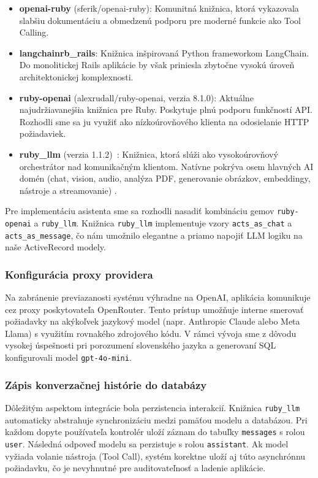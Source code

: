 \begin{itemize}
	\item \textbf{openai-ruby} (sferik/openai-ruby): Komunitná knižnica, ktorá
		vykazovala slabšiu dokumentáciu a obmedzenú podporu pre moderné funkcie ako
		Tool Calling.

	\item \textbf{langchainrb\_rails}: Knižnica inšpirovaná Python frameworkom LangChain.
		Do monolitickej Rails aplikácie by však priniesla zbytočne vysokú úroveň
		architektonickej komplexnosti.

	\item \textbf{ruby-openai} (alexrudall/ruby-openai, verzia 8.1.0): Aktuálne najudržiavanejšia
		knižnica pre Ruby. Poskytuje plnú podporu funkčností API. Rozhodli sme sa ju využiť
		ako nízkoúrovňového klienta na odosielanie HTTP požiadaviek.

	\item \textbf{ruby\_llm} (verzia 1.1.2)~\cite{rubyllm2025}: Knižnica, ktorá slúži
		ako vysokoúrovňový %
		orchestrátor nad komunikačným klientom. Natívne pokrýva osem hlavných AI domén
		(chat, vision, audio, analýza PDF, generovanie obrázkov, embeddingy,
		nástroje a streamovanie) \cite{atkinson2025}.
\end{itemize}

Pre implementáciu asistenta sme sa rozhodli nasadiť kombináciu gemov \texttt{ruby-openai}
a \texttt{ruby\_llm}. Knižnica \texttt{ruby\_llm} implementuje vzory \texttt{acts\_as\_chat}
a \texttt{acts\_as\_message}, čo nám umožnilo elegantne a priamo napojiť LLM logiku
na naše ActiveRecord modely.

\subsubsection{Konfigurácia proxy providera}
Na zabránenie previazanosti systému výhradne na OpenAI, aplikácia komunikuje cez
proxy poskytovateľa OpenRouter. Tento prístup umožňuje interne smerovať požiadavky
na akýkoľvek jazykový model (napr. Anthropic Claude alebo Meta Llama) s využitím
rovnakého zdrojového kódu. V rámci vývoja sme z dôvodu vysokej úspešnosti pri porozumení
slovenského jazyka a generovaní SQL konfigurovali model \texttt{gpt-4o-mini}.

\subsubsection{Zápis konverzačnej histórie do databázy}
Dôležitým aspektom integrácie bola perzistencia interakcií. Knižnica \texttt{ruby\_llm}
automaticky abstrahuje synchronizáciu medzi pamäťou modelu a databázou. Pri každom
dopyte používateľa kontrolér uloží záznam do tabuľky \texttt{messages} s rolou
\texttt{user}. Následná odpoveď modelu sa perzistuje s rolou \texttt{assistant}.
Ak model vyžiada volanie nástroja (Tool Call), systém korektne uloží aj túto asynchrónnu
požiadavku, čo je nevyhnutné pre auditovateľnosť a ladenie aplikácie.

